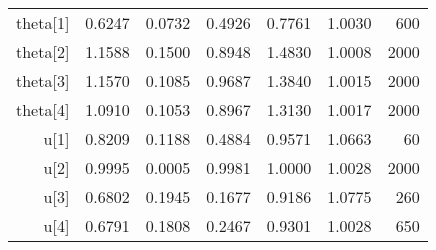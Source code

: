 \begin{table}[ht]
\begin{tabular}{rrrrrrr}
  theta[1] & 0.6247 & 0.0732 & 0.4926 & 0.7761 & 1.0030 &   600 \\ 
  theta[2] & 1.1588 & 0.1500 & 0.8948 & 1.4830 & 1.0008 &  2000 \\ 
  theta[3] & 1.1570 & 0.1085 & 0.9687 & 1.3840 & 1.0015 &  2000 \\ 
  theta[4] & 1.0910 & 0.1053 & 0.8967 & 1.3130 & 1.0017 &  2000 \\ 
  u[1] & 0.8209 & 0.1188 & 0.4884 & 0.9571 & 1.0663 &    60 \\ 
  u[2] & 0.9995 & 0.0005 & 0.9981 & 1.0000 & 1.0028 &  2000 \\ 
  u[3] & 0.6802 & 0.1945 & 0.1677 & 0.9186 & 1.0775 &   260 \\ 
  u[4] & 0.6791 & 0.1808 & 0.2467 & 0.9301 & 1.0028 &   650 \\ 
   \hline
\end{tabular}
\end{table}

